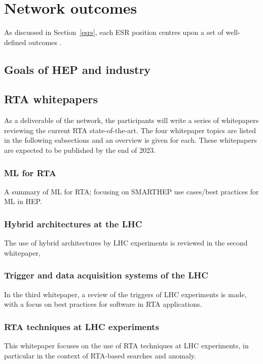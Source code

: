 \section{Network outcomes}
\label{outcomes}
As discussed in Section~\ref{esrs}, each ESR position centres upon a set of well-defined outcomes .

\subsection{Goals of HEP and industry}
\label{goals}

\subsection{RTA whitepapers}
\label{whitepapers}
As a deliverable of the network, the participants will write a series of whitepapers reviewing the current RTA state-of-the-art. The four whitepaper topics are listed in the following subsections and an overview is given for each. These whitepapers are expected to be published by the end of 2023.

\subsubsection{ML for RTA}
\label{wp-ML-for-RTA}
A summary of ML for RTA; focusing on SMARTHEP use cases/best practices for ML in HEP.

\subsubsection{Hybrid architectures at the LHC}
\label{wp-hybrid-architectures-LHC}
The use of hybrid architectures by LHC experiments is reviewed in the second whitepaper, 

\subsubsection{Trigger and data acquisition systems of the LHC}
\label{wp-TDAQ-at-LHC}
In the third whitepaper, a review of the triggers of LHC experiments is made, with a focus on best practices for software in RTA applications.

\subsubsection{RTA techniques at LHC experiments}
\label{wp-RTA-at-LHC}
This whitepaper focuses on the use of RTA techniques at LHC experiments, in particular in the context of RTA-based searches and anomaly.


